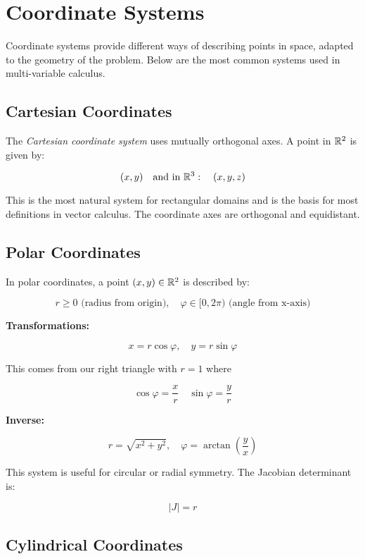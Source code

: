 \newpage
\section{Coordinate Systems}

Coordinate systems provide different ways of describing points in space, adapted to the geometry of the 
problem. Below are the most common systems used in multi-variable calculus.

\subsection{Cartesian Coordinates}

The \emph{Cartesian coordinate system} uses mutually orthogonal axes. A point in \( \mathbb{R}^2 \) 
is given by:

\[
    (x, y) \quad \text{and in } \mathbb{R}^3: \quad (x, y, z)
\]

This is the most natural system for rectangular domains and is the basis for most definitions in vector 
calculus. The coordinate axes are orthogonal and equidistant.

\subsection{Polar Coordinates}

In polar coordinates, a point \( (x, y) \in \mathbb{R}^2 \) is described by:

\[
    r \ge 0 \text{ (radius from origin)}, \quad \varphi \in [0, 2\pi) \text{ (angle from x-axis)}
\]

\textbf{Transformations:}

\[
    x = r \cos \varphi, \quad y = r \sin \varphi
\]

This comes from our right triangle with \(r = 1\) where

\[
    \cos \varphi = \frac{x}{r} \quad \sin \varphi = \frac{y}{r}
\]

\textbf{Inverse:}

\[
    r = \sqrt{x^2 + y^2}, \quad \varphi = \arctan\left(\frac{y}{x}\right)
\]

This system is useful for circular or radial symmetry. The Jacobian determinant is:

\[
    |J| = r
\]

\subsection{Cylindrical Coordinates}

